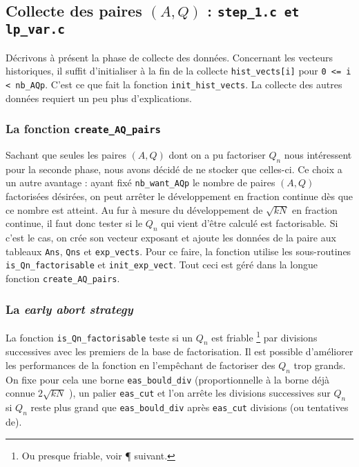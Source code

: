 \subsection{Collecte des paires $(A,Q)$ : \texttt{step\_1.c et lp\_var.c}}

Décrivons à présent la phase de collecte des données. Concernant les vecteurs
historiques, il suffit d'initialiser à la fin de la collecte
\texttt{hist\_vects[i]} pour \texttt{0 <= i < nb\_AQp}. C'est ce que fait la
fonction \texttt{init\_hist\_vects}. La collecte des autres données requiert un
peu plus d'explications. 

\subsubsection{La fonction \texttt{create\_AQ\_pairs}}

Sachant que seules les paires $(A,Q)$ dont on a pu factoriser $Q_n$ nous
intéressent pour la seconde phase, nous avons décidé de ne stocker que
celles-ci. Ce choix a un autre avantage : ayant fixé \texttt{nb\_want\_AQp} le
nombre de paires $(A, Q)$ factorisées désirées, on peut arrêter le
développement en fraction continue dès que ce nombre est atteint. Au fur à
mesure du développement de $\sqrt{kN}$ en fraction continue, il faut donc
tester si le $Q_n$ qui vient d'être calculé est factorisable. Si c'est le cas,
on crée son vecteur exposant et ajoute les données de la paire aux tableaux
\texttt{Ans}, \texttt{Qns} et \texttt{exp\_vects}. Pour ce faire, la fonction
utilise les sous-routines \texttt{is\_Qn\_factorisable} et
\texttt{init\_exp\_vect}. Tout ceci est géré dans la longue fonction
\texttt{create\_AQ\_pairs}.

\subsubsection{La \textit{early abort strategy}}

La fonction \texttt{is\_Qn\_factorisable} teste si un $Q_n$ est friable
\footnote{Ou presque friable, voir ¶ suivant.} par divisions successives avec
les premiers de la base de factorisation. Il est possible d'améliorer les
performances de la fonction en l'empêchant de factoriser des $Q_n$ trop grands.
On fixe pour cela une borne \texttt{eas\_bould\_div} (proportionnelle à la
borne déjà connue $2\sqrt{kN}$ ), un palier
\texttt{eas\_cut} et l'on arrête les divisions successives sur $Q_n$ si $Q_n$
reste plus grand que \texttt{eas\_bould\_div} après \texttt{eas\_cut}
divisions (ou tentatives de).

